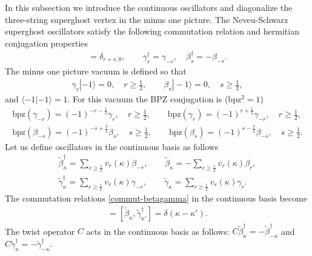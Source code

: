 \documentclass[a4paper,12pt]{article}
\begin{document}
In this subsection we introduce the continuous oscillators
and diagonalize the three-string superghost
vertex in the minus one picture.
The Neveu-Schwarz superghost
oscillators satisfy the following commutation relation
and hermitian conjugation properties
\begin{gather}
[\gamma_{r},\beta_{s}]=\delta_{r+s,0},\qquad
\gamma_{r}^{\dag}=\gamma_{-r},\quad \beta^{\dag}_{s}=-\beta_{-s}.
\label{commut-betagamma}
\end{gather}
The minus one picture vacuum is defined so that
\begin{gather}
\gamma_{r}|-1\rangle=0,\quad r\geq\tfrac12,\qquad
\beta_{s}|-1\rangle=0,\quad s\geq\tfrac12,
\end{gather}
and $\langle -1|-1\rangle=1$.
For this vacuum the BPZ conjugation is (bpz$^2=1$)
\begin{subequations}
\begin{gather}
\text{bpz}(\gamma_{-r})=(-1)^{-r-\tfrac12}\gamma_{r},\quad r\geq\tfrac12,\qquad
\text{bpz}(\gamma_{r})=(-1)^{r+\tfrac12}\gamma_{-r},\quad r\geq\tfrac12,\\
\text{bpz}(\beta_{-s})=(-1)^{-s+\tfrac32}\beta_{s},\quad s\geq\tfrac12,\qquad
\text{bpz}(\beta_{s})=(-1)^{s-\tfrac32}\beta_{-s},\quad s\geq\tfrac12.
\end{gather}
\label{beta-gamma-minus-bpz}
\end{subequations}
Let us define oscillators in the continuous basis as follows
\begin{subequations}
\begin{gather}
\tilde{\beta}^{\dag}_{\kappa}
=\sum_{r\geq\tfrac12}v_{r}(\kappa)\beta_{-r},\qquad
\tilde{\beta}_{\kappa}
=-\sum_{r\geq\tfrac12}v_{r}(\kappa)\beta_{r},\\
\tilde{\gamma}^{\dag}_{\kappa}
=\sum_{r\geq\tfrac12}v_{r}(\kappa)\gamma_{-r},\qquad
\tilde{\gamma}_{\kappa}
=\sum_{r\geq\tfrac12}v_{r}(\kappa)\gamma_{r}.
\end{gather}
\end{subequations}
The commutation relations \eqref{commut-betagamma}
in the continuous basis become
\begin{gather}
[\tilde{\gamma}_{\kappa},\tilde{\beta}^{\dag}_{\kappa'}]=
[\tilde{\beta}_{\kappa},\tilde{\gamma}^{\dag}_{\kappa'}]
=\delta(\kappa - \kappa').
\end{gather}
The twist operator $C$ acts in the continuous basis as follows:
$C\tilde{\beta}^{\dag}_{\kappa}=-\tilde{\beta}^{\dag}_{-\kappa}$
and $C\tilde{\gamma}^{\dag}_{\kappa}=-\tilde{\gamma}^{\dag}_{-\kappa}$.
\end{document}
